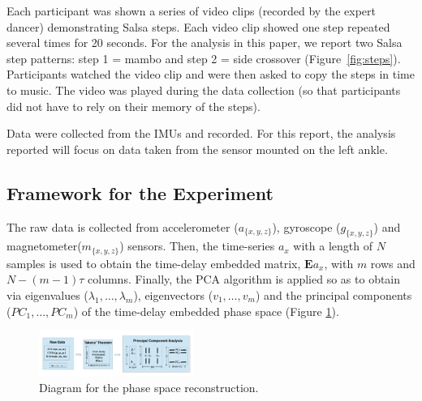 \documentclass[10pt,journal,compsoc]{IEEEtran}
\begin{document}
Each participant was shown a series of video clips (recorded
by the expert dancer) demonstrating Salsa steps. Each video
clip showed one step repeated several times for 20 seconds.
For the analysis in this paper, we report two Salsa step patterns: 
step 1 = mambo and step 2 = side crossover (Figure~\ref{fig:steps}).
Participants watched the video clip and were then asked to
copy the steps in time to music. The video was played during
the data collection (so that participants did not have to rely on
their memory of the steps).

Data were collected from the IMUs and recorded. 
For this report, the analysis reported will focus on data taken from the
sensor mounted on the left ankle.


\subsection{Framework for the Experiment}
The raw data is collected from 
accelerometer ($a_{ \{ x,y,z \} }$), gyroscope ($g_{ \{ x,y,z \} }$) 
and magnetometer($m_{ \{ x,y,z \} }$) sensors. 
Then, the time-series $a_x$ with a length of $N$ samples is used to obtain 
the time-delay embedded matrix, $\boldsymbol{E} a_{x}$, with $m$ rows and $N-(m-1)\tau$ columns. 
Finally, the PCA algorithm is applied so as to obtain via eigenvalues 
($\lambda_1,\ldots,\lambda_m$), eigenvectors ($v_1,\ldots,v_m$) and the principal components 
($PC_1,\ldots,PC_m$) of the time-delay embedded phase space (Figure \ref{fig:raw_takens_pca}).
\begin{figure}[!htb]
\centering
\includegraphics[width=0.45\textwidth]{diagram_v10}
\caption[PA]{Diagram for the phase space reconstruction.}
\label{fig:raw_takens_pca}
\end{figure}
\end{document}
